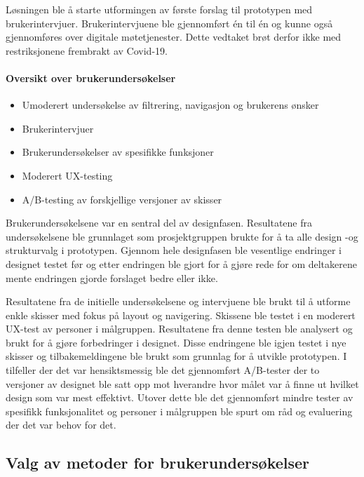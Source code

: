 Løsningen ble å starte utformingen av første forslag til prototypen med brukerintervjuer. Brukerintervjuene ble gjennomført én til én og kunne også gjennomføres over digitale møtetjenester. Dette vedtaket brøt derfor ikke med restriksjonene frembrakt av Covid-19.

\paragraph{Oversikt over brukerundersøkelser}
\begin{itemize}
\item Umoderert undersøkelse av filtrering, navigasjon og brukerens ønsker
\item Brukerintervjuer
\item Brukerundersøkelser av spesifikke funksjoner
\item Moderert UX-testing
\item A/B-testing av forskjellige versjoner av skisser
\end{itemize}

Brukerundersøkelsene var en sentral del av designfasen. Resultatene fra undersøkelsene ble grunnlaget som prosjektgruppen brukte for å ta alle design -og strukturvalg i prototypen. Gjennom hele designfasen ble vesentlige endringer i designet testet før og etter endringen ble gjort for å gjøre rede for om deltakerene mente endringen gjorde forslaget bedre eller ikke.

Resultatene fra de initielle undersøkelsene og intervjuene ble brukt til å utforme enkle skisser med fokus på layout og navigering. Skissene ble testet i en moderert UX-test av personer i målgruppen. Resultatene fra denne testen ble analysert og brukt for å gjøre forbedringer i designet. Disse endringene ble igjen testet i nye skisser og tilbakemeldingene ble brukt som grunnlag for å utvikle prototypen. I tilfeller der det var hensiktsmessig ble det gjennomført A/B-tester der to versjoner av designet ble satt opp mot hverandre hvor målet var å finne ut hvilket design som var mest effektivt. Utover dette ble det gjennomført mindre tester av spesifikk funksjonalitet og personer i målgruppen ble spurt om råd og evaluering der det var behov for det.

\subsection{Valg av metoder for brukerundersøkelser}


